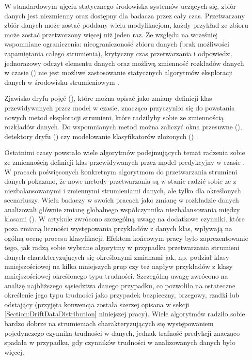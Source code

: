 W standardowym ujęciu statycznego środowiska systemów uczących się, zbiór danych jest niezmienny oraz dostępny dla badacza przez cały czas. Przetwarzany zbiór danych może zostać poddany wielu modyfikacjom, każdy przykład ze zbioru może zostać przetworzony więcej niż jeden raz. Ze względu na wcześniej wspomniane ograniczenia: nieograniczoność zbioru danych (brak możliwości zapamiętania całego strumienia), krytyczny czas przetwarzania i odpowiedzi, jednorazowy odczyt elementu danych oraz możliwą zmienność rozkładów danych w czasie () nie jest możliwe zastosowanie statycznych algorytmów eksploracji danych w środowisku strumieniowym \cite{Article:TradDataStream}\cite{Prezentacja:Strumienie}.

Zjawisko dryfu pojęć (), które można opisać jako zmiany definicji klas przewidywanych przez model w czasie, znacząco przyczyniło się do powstania nowych metod eksploracji strumieni, które radziłyby sobie ze zmiennością rozkładów danych. Do wspomnianych metod można zaliczyć okna przesuwne (), detektory dryfu () czy modelowanie klasyfikatorów złożonych () \cite{DBrzezinski}.

Ostatnimi czasy powstało wiele algorytmów podejmujących temat radzenia sobie ze zmiennością definicji klas przewidywanych przez model predykcyjny w czasie \cite{BrzezPhd2015}\cite{Article:ManyAlgorithms}\cite{Article:OBFirst}\cite{Article:OBSecond}. W pracach poświęconych konkretnym algorytmom do przetwarzania strumieni danych pokazano, że nowe metody przetwarzania są w stanie radzić sobie ze z niezbalansowanymi i zmiennymi strumieniami danych, ale tylko dla określonych scenariuszy. Wielu badaczy w swoich pracach jako zmianę w rozkładzie danych analizowali głównie zmianę globalnego współczynnika niezbalansowania między klasami (). W artykule \cite{Article:TypyPrzykladow} zwrócono szczególną uwagę na dodatkowe czynniki, które poza zmianą liczności występowania przykładów z danych klas, wpływają na ogólną ocenę procesu klasyfikacji. Efektem końcowym pracy było zaprezentowanie tego, jak radzą sobie wybrane algorytmy w przypadku przetwarzania strumieni danych charakteryzujących się określonymi zmianami jak, np. podział klasy mniejszościowej na kilka mniejszych grup czy też napływ przykładów z klasy mniejszościowej określonego typu trudności. Szczególną uwagę zwrócono na analizę najbliższego sąsiedztwa danego przypadku, co pozwoliło na ostateczne określenie jego typu trudności jako przypadek bezpieczny, brzegowy, rzadki lub odstający (przyjęta konwencja została szerzej opisana w sekcji \ref{Section:DriftDataDistribution} niniejszej pracy). Wiele algorytmów radziło sobie bardzo dobrze na strumieniach charakteryzujących się występowaniem pojedynczego czynnika trudności w danych, jednak trafność predykcji znacząco spadała w przypadku, gdy czynników trudności w analizowanych danych było więcej.

